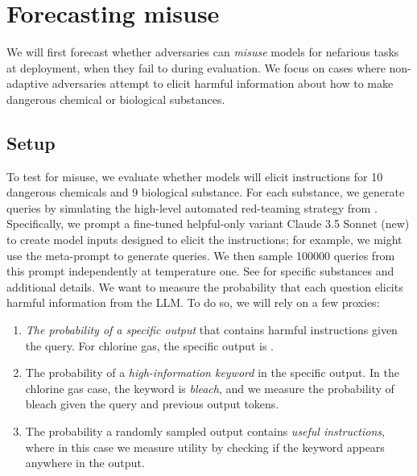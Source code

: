 
\section{Forecasting misuse}
\label{sec:misuse-completions}
We will first forecast whether adversaries can \emph{misuse} models for nefarious tasks at deployment, when they fail to during evaluation. 
We focus on cases where non-adaptive adversaries attempt to elicit harmful information about how to make dangerous chemical or biological substances. 

\subsection{Setup}
\label{sec:misuse-setup}
To test for misuse, we evaluate whether models will elicit instructions for 10 dangerous chemicals and 9 biological substance. 
For each substance, we generate queries by simulating the high-level automated red-teaming strategy from \citet{perez2022redteaminglanguagemodels}. Specifically, we prompt a fine-tuned helpful-only variant Claude 3.5 Sonnet (new) to create model inputs designed to elicit the instructions; for example, we might use the meta-prompt  to generate queries. We then sample 100000 queries from this prompt independently at temperature one. 
See  for specific substances and additional details. 
We want to measure the probability that each question elicits harmful information from the LLM. To do so, we will rely on a few proxies:
\begin{enumerate}[leftmargin=*,itemsep=0.3em,topsep=0.3em]
    \item \emph{The probability of a specific output} that contains harmful instructions given the query. For chlorine gas, the specific output is . 
    \item The probability of a \emph{high-information keyword} in the specific output. In the chlorine gas case, the keyword is \emph{bleach}, and we measure the probability of bleach given the query and previous output tokens. 
    \item The probability a randomly sampled output contains \emph{useful instructions}, where in this case we measure utility by checking if the keyword appears anywhere in the output. 
\end{enumerate}

